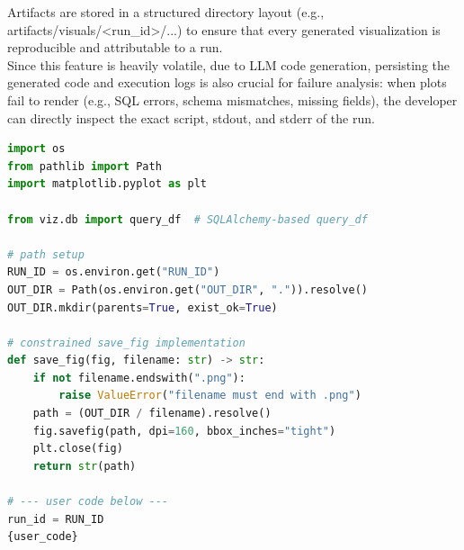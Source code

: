 Artifacts are stored in a structured directory layout (e.g., artifacts/visuals/<run\_id>/...) to ensure that every generated visualization is reproducible and attributable to a run. \\
Since this feature is heavily volatile, due to LLM code generation, persisting the generated code and execution logs is also crucial for failure analysis: when plots fail to render (e.g., SQL errors, schema mismatches, missing fields), the developer can directly inspect the exact script, stdout, and stderr of the run.

\begin{lstlisting}[language=Python, caption={Safety and reproducibility wrapper for executing LLM-generated plotting code}, label={lst:code-exec-wrapper}]
import os
from pathlib import Path
import matplotlib.pyplot as plt

from viz.db import query_df  # SQLAlchemy-based query_df

# path setup
RUN_ID = os.environ.get("RUN_ID")
OUT_DIR = Path(os.environ.get("OUT_DIR", ".")).resolve()
OUT_DIR.mkdir(parents=True, exist_ok=True)

# constrained save_fig implementation
def save_fig(fig, filename: str) -> str:
    if not filename.endswith(".png"):
        raise ValueError("filename must end with .png")
    path = (OUT_DIR / filename).resolve()
    fig.savefig(path, dpi=160, bbox_inches="tight")
    plt.close(fig)
    return str(path)

# --- user code below ---
run_id = RUN_ID
{user_code}
\end{lstlisting}

